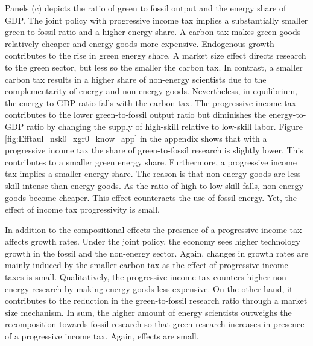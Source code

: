 Panels (c) depicts the ratio of green to fossil output and the energy share of GDP. The joint policy with progressive income tax implies a substantially smaller green-to-fossil ratio and a higher energy share.  
A carbon tax makes green goods relatively cheaper and energy goods more expensive. Endogenous growth contributes to the rise in green energy share. A market size effect directs research to the green sector, but less so the smaller the carbon tax. In contrast, a smaller carbon tax results in a higher share of non-energy scientists due to the complementarity of energy and non-energy goods. Nevertheless, in equilibrium, the energy to GDP ratio falls with the carbon tax. 
The progressive income tax contributes to the lower green-to-fossil output ratio but diminishes the energy-to-GDP ratio  by changing the supply of high-skill relative to low-skill labor. Figure \ref{fig:Efftaul_nsk0_xgr0_know_app} in the appendix shows that with a progressive income tax the share of green-to-fossil research is slightly lower. This contributes to a smaller green energy share. Furthermore, a progressive income tax implies a smaller energy share. The reason is that non-energy goods are less skill intense than energy goods. As the ratio of high-to-low skill falls, non-energy goods become cheaper. This effect counteracts the use of fossil energy. Yet, the effect of income tax progressivity is small. 

 
In addition to the compositional effects the presence of a progressive income tax affects growth rates. 
Under the joint policy, the economy sees higher technology growth in the fossil and the non-energy sector. 
Again, changes in growth rates are mainly induced by the smaller carbon tax as the effect of progressive income taxes is small. Qualitatively, the progressive income tax counters higher non-energy research by making energy goods less expensive. On the other hand, it contributes to the reduction in the green-to-fossil research ratio through a market size mechanism.  In sum, the higher amount of energy scientists outweighs the recomposition towards fossil research so that green research increases in presence of a progressive income tax. Again, effects are small. 

